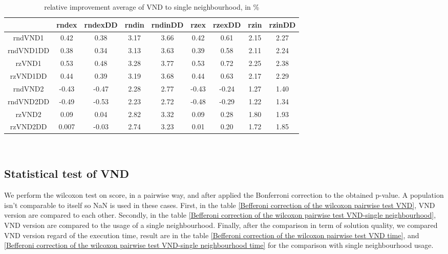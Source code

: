 \documentclass[12pt,a4paper]{article}
\begin{document}
\begin{table}[!h]
\centering
\begin{tabular}{|*{9}{c|}}
  \hline
   & rndex & rndexDD & rndin & rndinDD & rzex & rzexDD & rzin & rzinDD \\
  \hline
  rndVND1 & 0.42 & 0.38 & 3.17 & 3.66 & 0.42 & 0.61 & 2.15 & 2.27 \\
  rndVND1DD & 0.38 & 0.34 & 3.13 & 3.63 & 0.39 & 0.58 & 2.11 & 2.24 \\
  rzVND1 & 0.53 & 0.48 & 3.28 & 3.77 & 0.53 & 0.72 & 2.25 & 2.38 \\
  rzVND1DD & 0.44 & 0.39 & 3.19 & 3.68 & 0.44 & 0.63 & 2.17 & 2.29 \\
  rndVND2 & -0.43 & -0.47 & 2.28 & 2.77 & -0.43 & -0.24 & 1.27 & 1.40 \\
  rndVND2DD & -0.49 & -0.53 & 2.23 & 2.72 & -0.48 & -0.29 & 1.22 & 1.34 \\
  rzVND2 & 0.09 & 0.04 & 2.82 & 3.32 & 0.09 & 0.28 & 1.80 & 1.93 \\
  rzVND2DD & 0.007 & -0.03 & 2.74 & 3.23 & 0.01 & 0.20 & 1.72 & 1.85 \\
  \hline
\end{tabular}
\caption{relative improvement average of VND to single neighbourhood, in \%}
\label{relative improvement average of VND to single neighbourhood}
\end{table}

~\\

\subsection{Statistical test of VND}
 
We perform the wilcoxon test on score, in a pairwise way, and after applied the Bonferroni correction to the obtained p-value. A population isn't comparable to itself so NaN is used in these cases. First, in the table \ref{Befferoni correction of the wilcoxon pairwise test VND}, VND version are compared to each other. Secondly, in the table \ref{Befferoni correction of the wilcoxon pairwise test VND-single neighbourhood}, VND version are compared to the usage of a single neighbourhood. Finally, after the comparison in term of solution quality, we compared VND version regard of the execution time, result are in the table \ref{Befferoni correction of the wilcoxon pairwise test VND time}, and \ref{Befferoni correction of the wilcoxon pairwise test VND-single neighbourhood time} for the comparison with single neighbourhood usage.
 
\end{document}
